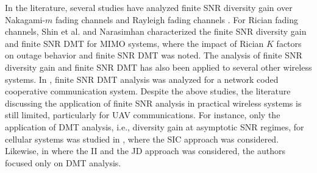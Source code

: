 In the literature, several studies have analyzed finite SNR diversity gain over Nakagami-$m$ fading channels \cite{wang2012finite} and Rayleigh fading channels \cite{lin2013outage,yang2015efficient}. For Rician fading channels, Shin et al. \cite{shin2008diversity} and      Narasimhan \cite{narasimhan2006finite} characterized the finite SNR diversity gain and finite SNR DMT for MIMO systems, where the impact of Rician $K$ factors on outage behavior and finite SNR DMT was noted. The analysis of finite SNR diversity gain and finite SNR DMT has also been applied to several other wireless systems. In \cite{heidarpour2017finite}, finite SNR DMT analysis was analyzed for a network coded cooperative communication system. Despite the above studies, the literature discussing the application of finite SNR analysis in practical wireless systems is still limited, particularly for UAV communications. For instance, only the application of DMT analysis, i.e., diversity gain at asymptotic SNR regimes, for cellular systems was studied in \cite{sirigina2016symbol, sirigina2016full}, where the SIC approach was considered. Likewise, in \cite{kim2019off} where the II and the JD approach was considered, the authors focused only on DMT analysis. 

\begin{table}[t]
\centering
\caption{References of finite SNR diversity gain and finite SNR DMT expressions for the II, SIC, and joint detectors at UAV-2.}
\label{table:lit_review_ref_schemes_diversity_gain}
\end{table}

